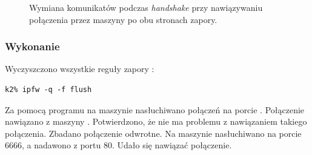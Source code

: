 \begin{figure}[h!]
  \centering
  \qquad\qquad\qquad
  \caption{Wymiana komunikatów podczas \emph{handshake} przy nawiązywaniu połączenia przez maszyny po obu stronach zapory.}
  \label{fig:stanowe:handshake}
\end{figure}


\subsubsection{Wykonanie}

Wyczyszczono wszystkie reguły zapory \ipfw:

\begin{lstlisting}
k2% ipfw -q -f flush
\end{lstlisting}

Za pomocą programu \nc{} na maszynie \kpiec{} nasłuchiwano połączeń na porcie
\pos. Połączenie nawiązano z maszyny \kdwa{}. Potwierdzono, że nie ma problemu z
nawiązaniem takiego połączenia. Zbadano połączenie odwrotne. Na maszynie \kdwa{}
nasłuchiwano na porcie 6666, a nadawono z portu 80. Udało się nawiązać
połączenie.

